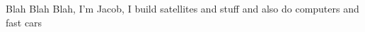

\begin{cvparagraph}

Blah Blah Blah, I'm Jacob, I build satellites and stuff and also do computers and fast cars
\end{cvparagraph}
